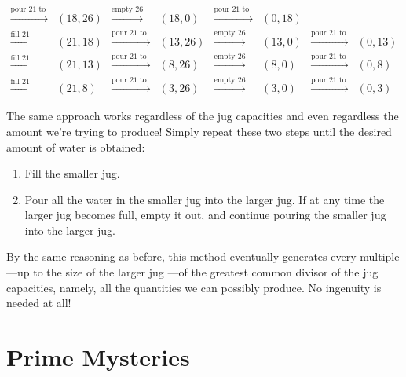 \[\begin{array}{cccccccc}
\xrightarrow{\text{pour 21 to 26}} & (18,26)& \xrightarrow{\text{empty
    26}} & (18,0)& \xrightarrow{\text{pour 21 to 26}} &
(0,18)\\ \xrightarrow{\text{fill 21}} & (21,18)&
\xrightarrow{\text{pour 21 to 26}} & (13,26)& \xrightarrow{\text{empty
    26}} & (13,0)& \xrightarrow{\text{pour 21 to 26}} &
(0,13)\\ \xrightarrow{\text{fill 21}} & (21,13)&
\xrightarrow{\text{pour 21 to 26}} & (8,26)& \xrightarrow{\text{empty
    26}} & (8,0)& \xrightarrow{\text{pour 21 to 26}} &
(0,8)\\ \xrightarrow{\text{fill 21}} & (21,8)& \xrightarrow{\text{pour
    21 to 26}} & (3,26)& \xrightarrow{\text{empty 26}} & (3,0)&
\xrightarrow{\text{pour 21 to 26}} & (0,3)
\end{array}
\]

The same approach works regardless of the jug capacities and even
regardless the amount we're trying to produce!  Simply repeat these
two steps until the desired amount of water is obtained:
\begin{enumerate}
\item Fill the smaller jug.

\item Pour all the water in the smaller jug into the larger jug.  If
  at any time the larger jug becomes full, empty it out, and continue
  pouring the smaller jug into the larger jug.
\end{enumerate}
By the same reasoning as before, this method eventually generates
every multiple ---up to the size of the larger jug ---of the greatest
common divisor of the jug capacities, namely, all the quantities we
can possibly produce.  No ingenuity is needed at all!

\begin{problems}

\practiceproblems
{}

\classproblems
{}

\homeworkproblems
{}

\end{problems}

\section{Prime Mysteries}

